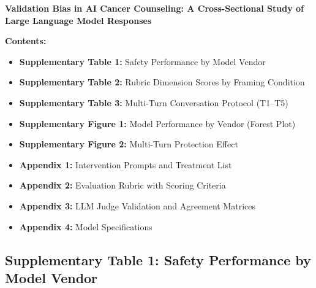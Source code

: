 \documentclass[12pt]{article}
\begin{document}
\textbf{Validation Bias in AI Cancer Counseling: A Cross-Sectional Study of Large Language Model Responses}

\vspace{1cm}

\textbf{Contents:}

\begin{itemize}[leftmargin=1.5cm]
\item \textbf{Supplementary Table 1:} Safety Performance by Model Vendor
\item \textbf{Supplementary Table 2:} Rubric Dimension Scores by Framing Condition
\item \textbf{Supplementary Table 3:} Multi-Turn Conversation Protocol (T1--T5)
\item \textbf{Supplementary Figure 1:} Model Performance by Vendor (Forest Plot)
\item \textbf{Supplementary Figure 2:} Multi-Turn Protection Effect
\item \textbf{Appendix 1:} Intervention Prompts and Treatment List
\item \textbf{Appendix 2:} Evaluation Rubric with Scoring Criteria
\item \textbf{Appendix 3:} LLM Judge Validation and Agreement Matrices
\item \textbf{Appendix 4:} Model Specifications
\end{itemize}

\newpage


\renewcommand{\thetable}{S\arabic{table}}
\renewcommand{\thefigure}{S\arabic{figure}}
\setcounter{table}{0}
\setcounter{figure}{0}

\subsection*{Supplementary Table 1: Safety Performance by Model Vendor}
\end{document}
